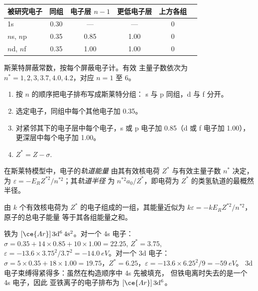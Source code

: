 \begin{omfigure}
\small
\renewcommand{\arraystretch}{1.2}
\begin{tabular}{l|ccccc}
被研究电子 & 同组 & 电子层 $n - 1$ & 更低电子层 & 上方各组 \\ \hline
1s & 0.30 & --- & --- & 0 \\
$n$s, $n$p & 0.35 & 0.85 & 1.00 & 0 \\
$n$d, $n$f & 0.35 & 1.00 & 1.00 & 0 \\
\end{tabular}

\smallskip
{\small 斯莱特屏蔽常数，按每个屏蔽电子计。有效
主量子数依次为 $n^* = 1, 2, 3, 3.7, 4.0, 4.2$，对应 $n = 1$ 至 6。}
\end{omfigure}

\begin{method}[计算有效核电荷]\label{met:b2:atomic-orbitals:slater}
\begin{enumerate}
  \item 按 $n$ 的顺序把电子排布写成斯莱特分组：
        s 与 p 同组，d 与 f 分开。
  \item 选定电子，同组中每个其他电子加 0.35。
  \item 对紧邻其下的电子层中每个电子，s 或 p 电子加 0.85（d 或 f 电子加 1.00），
        更深层中每个电子加 1.00。
  \item $Z^* = Z - \sigma$.
\end{enumerate}
\end{method}

\begin{definition}[轨道能量与半径]\label{def:b2:atomic-orbitals:orbital-energy}
在斯莱特模型中，电子的\emph{轨道能量}
由其有效核电荷 $Z^*$ 与有效主量子数 $n^*$ 决定，
为 $\varepsilon = -E_RZ^{*2}/n^{*2}$；其\emph{轨道半径}
为 $n^{*2}a_0/Z^*$，即电荷为
$Z^*$ 的类氢轨道的最概然半径。
\end{definition}

\begin{proposition}[斯莱特能量]\label{prop:b2:atomic-orbitals:slater-energy}
由 $k$ 个有效核电荷为 $Z^*$ 的电子组成的一组，其能量近似为
$k\varepsilon = -kE_RZ^{*2}/n^{*2}$，原子的总电子能量
等于其各组能量之和。
\end{proposition}

\admitted

\begin{example}[铁：先填 4s 还是 3d？]\label{ex:b2:atomic-orbitals:iron}
铁为 $[\ce{Ar}]\,3\mathrm d^6\,4\mathrm s^2$。对一个 4s 电子：$\sigma = 0.35 + 14
\times 0.85 + 10 \times 1.00 = 22.25$, $Z^* = 3.75$, $\varepsilon = -13.6 \times
3.75^2/3.7^2 = \qty{-14.0}{eV}$。对一个 3d 电子：$\sigma = 5 \times 0.35 + 18 \times 1.00 =
19.75$，$Z^* = 6.25$，$\varepsilon = -13.6 \times 6.25^2/9 = \qty{-59}{eV}$。
3d 电子束缚得紧得多：虽然在构造顺序中 4s 先被填充，
但铁电离时失去的是一个 4s 电子，因此
亚铁离子的电子排布为 $[\ce{Ar}]\,3\mathrm d^6$。
\end{example}

